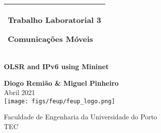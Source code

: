 %
%
%
%
%
\begin{titlepage}
  \addtolength{\hoffset}{0.5\evensidemargin-0.5\oddsidemargin} %
  \noindent%
  \begin{tabular}{@{}p{\textwidth}@{}}
    \toprule[2pt]
    \midrule
    \vspace{0.2cm}
    \begin{center}
    \Huge{\textbf{
        Trabalho Laboratorial 3 %
    }}
    \end{center}
    \begin{center}
      \Large{
        Comunicações Móveis%
      }
    \end{center}
    \vspace{0.2cm}\\
    \midrule
    \toprule[2pt]
  \end{tabular}
  \vspace{2cm}
  \begin{center}
    \Huge{\textbf{
        OLSR and IPv6 using Mininet %
    }}
  \end{center}
  \vspace{2cm}
  \begin{center}
    {\Large
      \textbf{Diogo Remião \& Miguel Pinheiro} \\ %
      \vspace{0.2cm}
      {\Large
    Abril 2021  %
    }\\
      \vspace{4cm}
      \texttt{[image: figs/feup/feup\_logo.png]}
    }
  \end{center}
  \vfill
  \begin{center}
  \vspace{0.5cm}
  Faculdade de Engenharia da Universidade do Porto\\
  TEC
  \end{center}
\end{titlepage}
\clearpage
